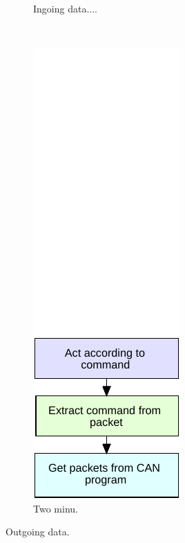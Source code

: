 \begin{figure}[!h]
\begin{subfigure}[b]{0.33\textwidth}
        \caption{Ingoing data....}
        \label{fig:filter_full}
    \end{subfigure}
    ~
    \begin{subfigure}[b]{0.33\textwidth}
        \includegraphics[width=\textwidth]{graphics/FlowChart_Node_Unpacking}
        \caption{Two minu.}
        \label{fig:filter_2}
    \end{subfigure}
        \caption{Outgoing data.}
           \label{fig:filter_fulll}
\end{figure}
